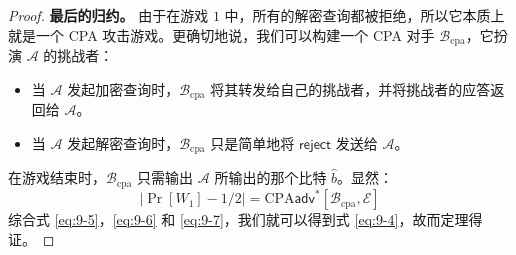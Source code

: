 \begin{proof}
\noindent\textbf{最后的归约。}
由于在游戏 $1$ 中，所有的解密查询都被拒绝，所以它本质上就是一个 CPA 攻击游戏。更确切地说，我们可以构建一个 CPA 对手 $\mathcal{B}_\mathrm{cpa}$，它扮演 $\mathcal{A}$ 的挑战者：
\begin{itemize}
	\item 当 $\mathcal{A}$ 发起加密查询时，$\mathcal{B}_\mathrm{cpa}$ 将其转发给自己的挑战者，并将挑战者的应答返回给 $\mathcal{A}$。
	\item 当 $\mathcal{A}$ 发起解密查询时，$\mathcal{B}_\mathrm{cpa}$ 只是简单地将 $\mathsf{reject}$ 发送给 $\mathcal{A}$。
\end{itemize}
在游戏结束时，$\mathcal{B}_\mathrm{cpa}$ 只需输出 $\mathcal{A}$ 所输出的那个比特 $\hat{b}$。显然：
\begin{equation}\label{eq:9-7}
\big\lvert
\Pr[W_1]-1/2
\big\rvert
=\mathrm{CPA}\mathsf{adv}^*[\mathcal{B}_\mathrm{cpa},\mathcal{E}]
\end{equation}
综合式 \ref{eq:9-5}，\ref{eq:9-6} 和 \ref{eq:9-7}，我们就可以得到式 \ref{eq:9-4}，故而定理得证。
\end{proof}